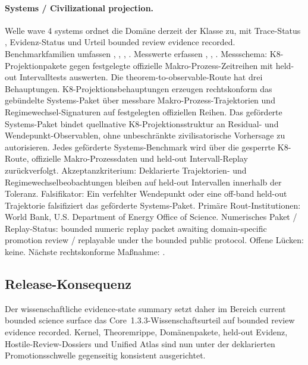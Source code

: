 \paragraph{Systems / Civilizational projection.}
Welle wave 4 systems ordnet die Domäne derzeit der Klasse  zu, mit Trace-Status , Evidenz-Status  und Urteil bounded review evidence recorded.
Benchmarkfamilien umfassen , \allowbreak {}, \allowbreak {}, \allowbreak {}.
Messwerte erfassen , \allowbreak {}, \allowbreak {}.
Messschema: K8-Projektionpakete gegen festgelegte offizielle Makro-Prozess-Zeitreihen mit held-out Intervalltests auswerten.
Die theorem-to-observable-Route hat drei Behauptungen. K8-Projektionsbehauptungen erzeugen rechtskonform das gebündelte Systems-Paket über messbare Makro-Prozess-Trajektorien und Regimewechsel-Signaturen auf festgelegten offiziellen Reihen. Das geförderte Systems-Paket bindet quellnative K8-Projektionsstruktur an Residual- und Wendepunkt-Observablen, ohne unbeschränkte zivilisatorische Vorhersage zu autorisieren. Jedes geförderte Systems-Benchmark wird über die gesperrte K8-Route, offizielle Makro-Prozessdaten und held-out Intervall-Replay zurückverfolgt.
Akzeptanzkriterium: Deklarierte Trajektorien- und Regimewechselbeobachtungen bleiben auf held-out Intervallen innerhalb der Toleranz.
Falsifikator: Ein verfehlter Wendepunkt oder eine off-band held-out Trajektorie falsifiziert das geförderte Systems-Paket.
Primäre Rout-Institutionen: World Bank, \allowbreak U.S. Department of Energy Office of Science.
Numerisches Paket / Replay-Status: bounded numeric replay packet awaiting domain-specific promotion review / replayable under the bounded public protocol.
Offene Lücken: keine.
Nächste rechtskonforme Maßnahme: .

\subsection{Release-Konsequenz}
Der wissenschaftliche evidence-state summary setzt daher im Bereich current bounded science surface das Core~1.3.3-Wissenschaftsurteil auf bounded review evidence recorded.
Kernel, Theoremrippe, Domänenpakete, held-out Evidenz, Hostile-Review-Dossiers und Unified Atlas sind nun unter der deklarierten Promotionsschwelle gegenseitig konsistent ausgerichtet.
